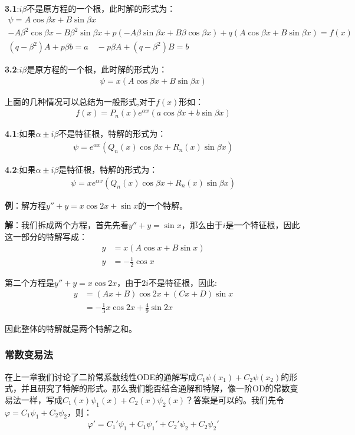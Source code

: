 \documentclass{ctexart}
\let\oldtextbf\textbf
\renewcommand{\textbf}[1]{\textcolor{brown!50!red}{\oldtextbf{#1}}}
\begin{document}
\textbf{\color{brown!50!red}3.1}:$i\beta$不是原方程的一个根，此时解的形式为：
\begin{gather*}
  \psi=A\cos\beta x+B\sin\beta x\tag{4-20}\\
-A\beta^2\cos\beta x-B\beta^2\sin\beta x+p(-A\beta\sin\beta x+B\beta\cos\beta x)
+q(A\cos\beta x+B\sin\beta x)=f(x)\\
(q-\beta^2)A+p\beta b=a\quad -p\beta A+(q-\beta^2)B=b
\end{gather*}

\textbf{\color{brown!50!red}3.2}:$i\beta$是原方程的一个根，此时解的形式为：
\begin{align*}
    \psi=x(A\cos\beta x+B\sin\beta x)\tag{4-21}
\end{align*}

上面的几种情况可以总结为一般形式,对于$f(x)$形如：
\begin{gather*}
  f(x)=P_n(x)e^{\alpha x}(a\cos\beta x+b\sin\beta x)
\end{gather*}

\textbf{\color{brown!50!red}4.1}:如果$\alpha\pm i\beta$不是特征根，特解的形式为：
\begin{gather*}
  \psi=e^{\alpha x}(Q_n(x)\cos\beta x+R_n(x)\sin\beta x)\tag{4-22} 
\end{gather*}

\textbf{\color{brown!50!red}4.2}:如果$\alpha\pm i\beta$是特征根，特解的形式为：
\begin{gather*}
  \psi=xe^{\alpha x}(Q_n(x)\cos\beta x+R_n(x)\sin\beta x)\tag{4-23} 
\end{gather*}

\textbf{\color{brown!50!red}例}：解方程$y''+y=x\cos 2x+\sin x$的一个特解。

\textbf{\color{brown!50!red}解}：我们拆成两个方程，首先先看$y''+y=\sin x$，那么由于$i$是一个特征根，因此这一部分的特解写成：
\begin{align*}
    y&=x(A\cos x+B\sin x)\\
    y&=-\frac{1}{2}\cos x
\end{align*}

第二个方程是$y''+y=x\cos 2x$，由于$2i$不是特征根，因此:
\begin{align*}
    y&=(Ax+B)\cos 2x+(Cx+D)\sin x\\
    &=-\frac{1}{3}x\cos 2x+\frac{4}{9}\sin 2x
\end{align*}

因此整体的特解就是两个特解之和。

\subsubsection{常数变易法}
在上一章我们讨论了二阶常系数线性ODE的通解写成$C_1\psi(x_1)+C_2\psi(x_2)$的形式，并且研究了特解的形式。那么我们能否结合通解和特解，像一阶OD的常数变易法一样，写成$C_1(x)\psi_1(x)+C_2(x)\psi_2(x)$？答案是可以的。我们先令$\varphi=C_1\psi_1+C_2\psi_2$，则：
\begin{gather*}
\varphi'=C_1'\psi_1+C_1\psi_1'+C_2'\psi_2+C_2\psi_2' 
\end{gather*}
\end{document}
